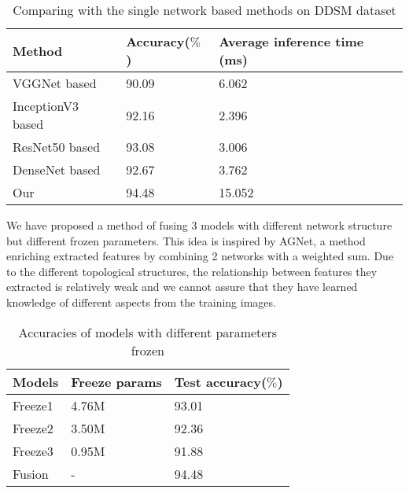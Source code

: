 \begin{table*}[!ht]
    \caption{Comparing with the single network 
        based methods on DDSM dataset}
    \label{tab:tabFusionNet}
    \setlength{\arrayrulewidth}{1.05 pt}
    \renewcommand{\arraystretch}{1.1}
    \begin{tabular*}{1.0\textwidth}{
        @{
            \extracolsep{\fill}
        }lll
    }
        \hline
        
        Method & Accuracy($\%$) 
        & Average inference time (ms) \\
        
        \hline
        
        VGGNet based        & 90.09 & 6.062 \\
        InceptionV3 based   & 92.16 & 2.396 \\
        ResNet50 based      & 93.08 & 3.006 \\
        DenseNet based      & 92.67 & 3.762 \\
        Our                 & 94.48 & 15.052 \\
        
        \hline
    \end{tabular*}
\end{table*}

We have proposed a method of fusing 3 models 
with different network structure but different 
frozen parameters. This idea is inspired by AGNet, 
a method enriching extracted features by combining 
2 networks with a weighted sum. Due to the 
different topological structures, the relationship
between features they extracted is relatively weak 
and we cannot assure that they have learned 
knowledge of different aspects from the training 
images.

\begin{table*}[!ht]
    \caption{Accuracies of models with different 
        parameters frozen}
    \label{tab:tabFusionPara}
    \setlength{\arrayrulewidth}{1.05 pt}
    \renewcommand{\arraystretch}{1.1}
    \begin{tabular*}{1.0\textwidth}{
        @{
            \extracolsep{\fill}
        }lll
    }
        \hline
        
        Models & Freeze params & Test accuracy($\%$) \\
        
        \hline
        
        Freeze1 & 4.76M & 93.01 \\
        Freeze2 & 3.50M & 92.36 \\
        Freeze3 & 0.95M & 91.88 \\
        Fusion  &  -    & 94.48 \\
        
        \hline
    \end{tabular*}
\end{table*}

